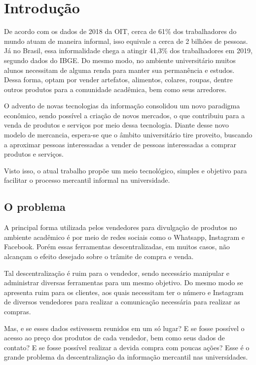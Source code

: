 \chapter{Introdução}


De acordo com os dados de 2018 da OIT\cite{grimshaw2019resumen}, cerca de 61\% dos trabalhadores do mundo atuam de maneira informal, isso equivale a cerca de 2 bilhões de pessoas. Já no Brasil, essa informalidade chega a atingir 41,3\% dos trabalhadores em 2019, segundo dados do IBGE. Do mesmo modo, no ambiente universitário muitos alunos necessitam de alguma renda para manter sua permanência e estudos\cite{ribeiro2005evasao}. Dessa forma, optam por vender artefatos, alimentos, colares, roupas, dentre outros produtos para a comunidade acadêmica, bem como seus arredores.

O advento de novas tecnologias da informação consolidou um novo paradigma econômico, sendo possível a criação de novos mercados, o que contribuiu para a venda de produtos e serviços por meio dessa tecnologia. Diante desse novo modelo de mercancia, espera-se que o âmbito universitário tire proveito, buscando a aproximar pessoas interessadas a vender de pessoas interessadas a comprar produtos e serviços.

Visto isso, o atual trabalho propõe um meio tecnológico, simples e objetivo para facilitar o processo mercantil informal na universidade.

\section{O problema}

A principal forma utilizada pelos vendedores para divulgação de produtos no ambiente acadêmico é por meio de redes sociais como o Whatsapp, Instagram e Facebook. Porém essas ferramentas descentralizadas, em muitos casos, não alcançam o efeito desejado sobre  o trâmite de compra e venda.

Tal descentralização é ruim para o vendedor, sendo necessário manipular e administrar diversas ferramentas para um mesmo objetivo. Do mesmo modo se apresenta ruim para os clientes, aos quais necessitam ter o número e Instagram de diversos vendedores para realizar a comunicação necessária para realizar as compras.

Mas, e se esses dados estivessem reunidos em um só lugar? E se fosse possível o acesso ao preço dos produtos de cada vendedor, bem como seus dados de contato? E se fosse possível realizar a devida compra com poucas ações? Esse é o grande problema da descentralização da informação mercantil nas universidades.

